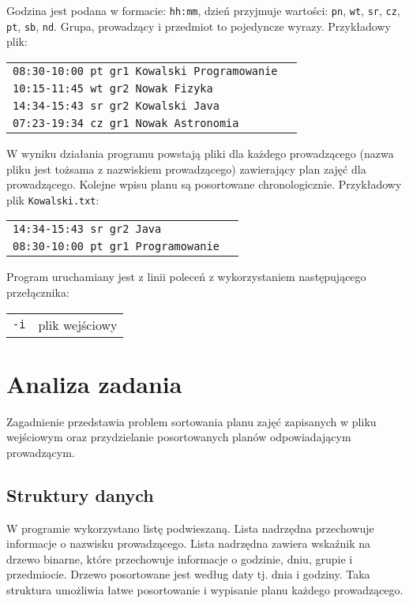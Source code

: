 \documentclass[12pt,a4paper,twoside]{article}
\let\oldmarginpar\marginpar
\renewcommand\marginpar[1]{%
  {\linespread{0.85}\normalfont\scriptsize%
\oldmarginpar[\hspace{1cm}\begin{minipage}{3cm}\raggedleft\scriptsize\color{black}\textsf{#1}\end{minipage}]%
{\hspace{0cm}\begin{minipage}{3cm}\raggedright\scriptsize\color{black}\textsf{#1}\end{minipage}}%
}%
}
\begin{document}
\noindent Godzina jest podana w formacie: \texttt{hh:mm}, dzień przyjmuje wartości: \texttt{pn}, \texttt{wt}, \texttt{sr}, \texttt{cz}, \texttt{pt}, \texttt{sb}, \texttt{nd}. Grupa,
prowadzący i przedmiot to pojedyncze wyrazy. Przykładowy plik: \newline

\begin{tabular}{ll}
\texttt{08:30-10:00 pt gr1 Kowalski Programowanie} \\
\texttt{10:15-11:45 wt gr2 Nowak Fizyka} \\
\texttt{14:34-15:43 sr gr2 Kowalski Java} \\
\texttt{07:23-19:34 cz gr1 Nowak Astronomia} \\
\end{tabular} \newline

\noindent W wyniku działania programu powstają pliki dla każdego prowadzącego (nazwa pliku jest tożsama z
nazwiskiem prowadzącego) zawierający plan zajęć dla prowadzącego. Kolejne wpisu planu są posortowane chronologicznie. Przykładowy plik \texttt{Kowalski.txt}: \newline

\begin{tabular}{ll}
\texttt{14:34-15:43 sr gr2 Java} \\
\texttt{08:30-10:00 pt gr1 Programowanie} \\
\end{tabular} \newline

Program uruchamiany jest z linii poleceń z wykorzystaniem następującego przełącznika: \\
\begin{tabular}{ll}
\indent \texttt{-i} & plik wejściowy \\
\end{tabular}

\section{Analiza zadania}
\marginpar{}

Zagadnienie przedstawia problem sortowania planu zajęć zapisanych w pliku wejściowym oraz przydzielanie posortowanych planów odpowiadającym prowadzącym.

\subsection{Struktury danych}
\marginpar{}
W programie wykorzystano listę podwieszaną. Lista nadrzędna przechowuje informacje o nazwisku prowadzącego. Lista nadrzędna zawiera wskaźnik na drzewo binarne, które przechowuje informacje o godzinie, dniu, grupie i przedmiocie. Drzewo posortowane jest według daty tj. dnia i godziny. Taka struktura umożliwia łatwe posortowanie i wypisanie planu każdego prowadzącego.
\end{document}
